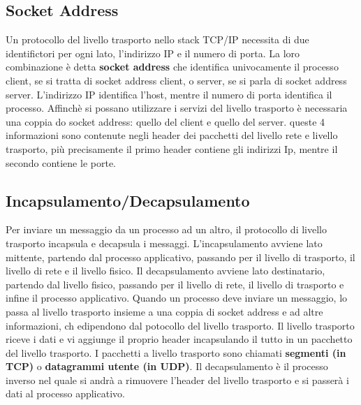 \documentclass[12pt]{report}
\begin{document}
	\subsection{Socket Address}
	Un protocollo del livello trasporto nello stack TCP/IP necessita di due identifictori per ogni lato, l'indirizzo IP e il numero di porta. La loro combinazione è detta \textbf{socket address} che identifica univocamente il processo client, se si tratta di socket address client, o server, se si parla di socket address server. L'indirizzo IP identifica l'host, mentre il numero di porta identifica il processo. Affinchè si possano utilizzare i servizi del livello trasporto è necessaria una coppia do socket address: quello del client e quello del server. queste 4 informazioni sono contenute negli header dei pacchetti del livello rete e livello trasporto, più precisamente il primo header contiene gli indirizzi Ip, mentre il secondo contiene le porte.

	\subsection{Incapsulamento/Decapsulamento}
	Per inviare un messaggio da un processo ad un altro, il protocollo di livello trasporto incapsula e decapsula i messaggi. L'incapsulamento avviene lato mittente, partendo dal processo applicativo, passando per il livello di trasporto, il livello di rete e il livello fisico. Il decapsulamento avviene lato destinatario, partendo dal livello fisico, passando per il livello di rete, il livello di trasporto e infine il processo applicativo. Quando un processo deve inviare un messaggio, lo passa al livello trasporto insieme a una coppia di socket address e ad altre informazioni, ch edipendono dal potocollo del livello trasporto. Il livello trasporto riceve i dati e vi aggiunge il proprio header incapsulando il tutto in un pacchetto del livello trasporto. I pacchetti a livello trasporto sono chiamati \textbf{segmenti (in TCP)} o \textbf{datagrammi utente (in UDP)}. Il decapsulamento è il processo inverso nel quale si andrà a rimuovere l'header del livello trasporto e si passerà i dati al processo applicativo.
\end{document}
